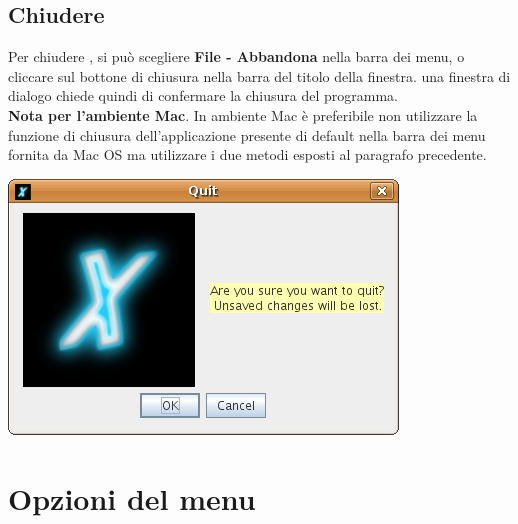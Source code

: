 \section{Chiudere \xlogo}
Per chiudere \xlogo, si può scegliere \textbf{File - Abbandona} nella barra dei menu, o cliccare sul bottone di chiusura nella barra del titolo della finestra. una finestra di dialogo chiede quindi di confermare la chiusura del programma.\\
\textbf{Nota per l'ambiente Mac}. In ambiente Mac è preferibile non utilizzare la funzione di chiusura dell'applicazione presente di default nella barra dei menu fornita da Mac OS ma utilizzare i due metodi esposti al paragrafo precedente.
\begin{center}
	\includegraphics[scale=0.4]{pics/interface-CaptureQuit.png}
\end{center}





\chapter{Opzioni del menu}

